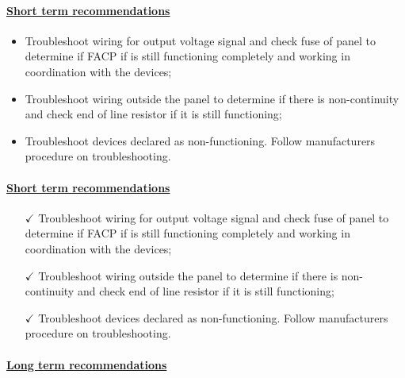 \paragraph{\underline{Short term recommendations}}

\begin{itemize}
\item Troubleshoot wiring for output voltage signal and check fuse of panel to determine if FACP if is still functioning completely and working in coordination with the devices;

\item Troubleshoot wiring outside the panel to determine if there is non-continuity and check end of line resistor if it is still functioning;

\item Troubleshoot devices declared as non-functioning. Follow manufacturers procedure on troubleshooting.

\end{itemize}


\paragraph{\underline{Short term recommendations}}

\begin{itemize}
	\item [$\checkmark$] Troubleshoot wiring for output voltage signal and check fuse of panel to determine if FACP if is still functioning completely and working in coordination with the devices;
	
	\item[$\checkmark$] Troubleshoot wiring outside the panel to determine if there is non-continuity and check end of line resistor if it is still functioning;
	
	\item[$\checkmark$] Troubleshoot devices declared as non-functioning. Follow manufacturers procedure on troubleshooting.
	
\end{itemize}


\paragraph{\underline{Long term recommendations}}

